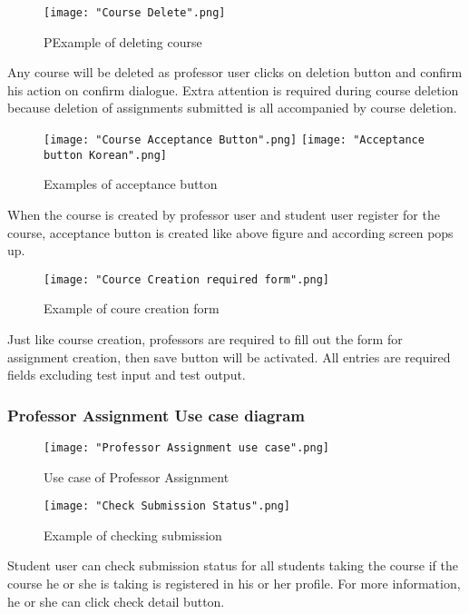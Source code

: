 \documentclass[10pt,journal,compsoc]{IEEEtran}
\begin{document}
\begin{figure}[H]
\centering
\texttt{[image: "Course Delete".png]}
{\caption*{PExample of deleting course}}
\end{figure}
Any course will be deleted as professor user clicks on deletion button and confirm his action on confirm dialogue. Extra attention is required during course deletion because deletion of assignments submitted is all accompanied by course deletion.
 
\begin{figure}[H]
\centering
\texttt{[image: "Course Acceptance Button".png]}
\texttt{[image: "Acceptance button Korean".png]}
{\caption*{Examples of acceptance button}}
\end{figure}
When the course is created by professor user and student user register for the course, acceptance button is created like above figure and according screen pops up. 

\begin{figure}[H]
\centering
\texttt{[image: "Cource Creation required form".png]}
{\caption*{Example of coure creation form}}
\end{figure}
Just like course creation, professors are required to fill out the form for assignment creation, then save button will be activated. All entries are required fields excluding test input and test output. 

\subsubsection{Professor Assignment Use case diagram}
\begin{figure}[H]
\centering
\texttt{[image: "Professor Assignment use case".png]}
{\caption*{Use case of Professor Assignment}}
\end{figure}



\begin{figure}[H]
\centering
\texttt{[image: "Check Submission Status".png]}
{\caption*{Example of checking submission}}
\end{figure}
Student user can check submission status for all students taking the course if the course he or she is taking is registered in his or her profile. For more information, he or she can click check detail button.
\end{document}
